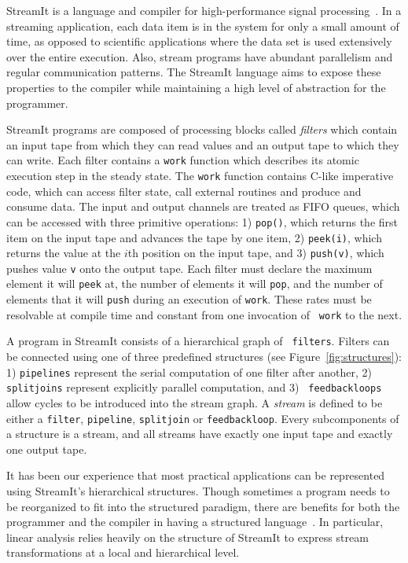 StreamIt is a language and compiler for high-performance signal
processing~\cite{gordon-thesis,streamit-asplos,streamitcc}.  In a
streaming application, each data item is in the system for only a
small amount of time, as opposed to scientific applications where the
data set is used extensively over the entire execution.  Also, stream
programs have abundant parallelism and regular communication patterns.
The StreamIt language aims to expose these properties to the compiler
while maintaining a high level of abstraction for the programmer.

StreamIt programs are composed of processing blocks called {\it
filters} which contain an input tape from which they can read values
and an output tape to which they can write. Each filter contains
a {\tt work} function which describes its atomic execution step in the
steady state.  The {\tt work} function contains C-like imperative
code, which can access filter state, call external routines and
produce and consume data.  The input and output channels are treated
as FIFO queues, which can be accessed with three primitive operations:
1) {\tt pop()}, which returns the first item on the input tape and
advances the tape by one item, 2) {\tt peek(i)}, which returns the
value at the $i$th position on the input tape, and 3) {\tt push(v)},
which pushes value {\tt v} onto the output tape.  Each filter
must declare the maximum element it will {\tt peek} at, the number of
elements it will {\tt pop}, and the number of elements that it will
{\tt push} during an execution of {\tt work}.  These rates must be
resolvable at compile time and constant from one invocation of {\tt
work} to the next.  

A program in StreamIt consists of a hierarchical graph of {\tt
filters}.  Filters can be connected using one of three predefined
structures (see Figure~\ref{fig:structures}): 1) {\tt pipelines}
represent the serial computation of one filter after another, 2) {\tt
splitjoins} represent explicitly parallel computation, and 3) {\tt
feedbackloops} allow cycles to be introduced into the stream graph.
A {\it stream} is defined to be either a {\tt filter}, {\tt pipeline}, 
{\tt splitjoin} or {\tt feedbackloop}. Every subcomponents of a structure 
is a stream, and all streams have
exactly one input tape and exactly one output tape.

It has been our experience that most practical applications can be
represented using StreamIt's hierarchical structures.  Though
sometimes a program needs to be reorganized to fit into the structured
paradigm, there are benefits for both the programmer and the compiler
in having a structured language~\cite{streamitcc}.  In particular,
linear analysis relies heavily on the structure of StreamIt to express
stream transformations at a local and hierarchical level.
